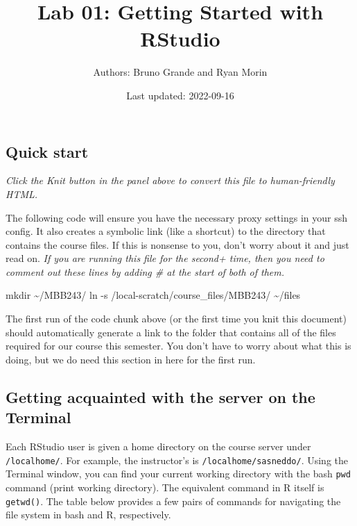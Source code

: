 \documentclass[
]{article}
\title{Lab 01: Getting Started with RStudio}
\author{Authors: Bruno Grande and Ryan Morin}
\date{Last updated: 2022-09-16}
\begin{document}
\maketitle

\hypertarget{quick-start}{%
\subsection{Quick start}\label{quick-start}}

\emph{Click the Knit button in the panel above to convert this file to
human-friendly HTML.}

The following code will ensure you have the necessary proxy settings in
your ssh config. It also creates a symbolic link (like a shortcut) to
the directory that contains the course files. If this is nonsense to
you, don't worry about it and just read on. \emph{If you are running
this file for the second+ time, then you need to comment out these lines
by adding \# at the start of both of them.}

mkdir \textasciitilde/MBB243/ ln -s /local-scratch/course\_files/MBB243/
\textasciitilde/files

The first run of the code chunk above (or the first time you knit this
document) should automatically generate a link to the folder that
contains all of the files required for our course this semester. You
don't have to worry about what this is doing, but we do need this
section in here for the first run.

\hypertarget{getting-acquainted-with-the-server-on-the-terminal}{%
\subsection{Getting acquainted with the server on the
Terminal}\label{getting-acquainted-with-the-server-on-the-terminal}}

Each RStudio user is given a home directory on the course server under
\texttt{/localhome/}. For example, the instructor's is
\texttt{/localhome/sasneddo/}. Using the Terminal window, you can find
your current working directory with the bash \texttt{pwd} command (print
working directory). The equivalent command in R itself is
\texttt{getwd()}. The table below provides a few pairs of commands for
navigating the file system in bash and R, respectively.
\end{document}
